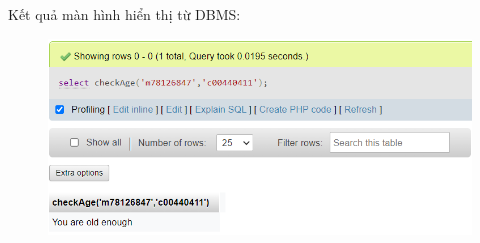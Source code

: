Kết quả màn hình hiển thị từ DBMS:
\begin{figure}[h]
    \centering
    \includegraphics{images/checkAge.png}
\end{figure}